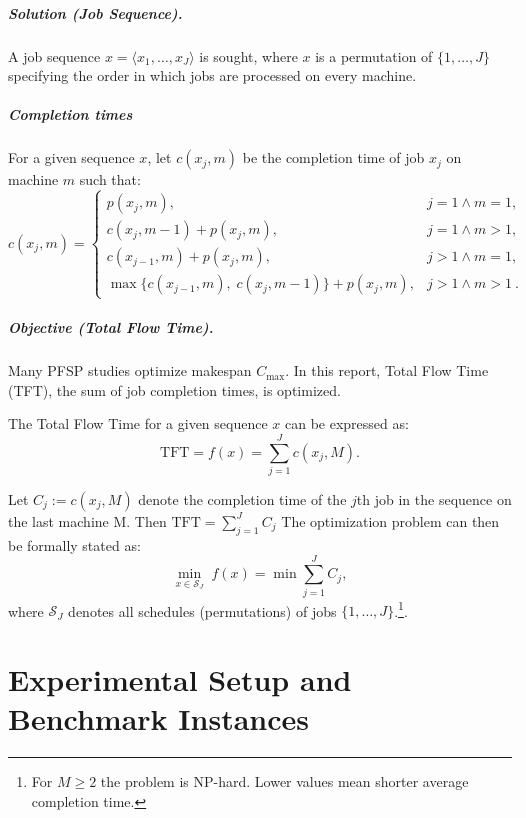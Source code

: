 \documentclass[12pt,a4paper]{report}
\begin{document}
\paragraph{Solution (Job Sequence).}
A job sequence $x = \langle x_1,\ldots,x_J\rangle$ is sought, where $x$ is a permutation of $\{1,\ldots,J\}$ specifying the order in which jobs are processed on every machine.

\paragraph{Completion times}
For a given sequence $x$, let $c(x_j,m)$ be the completion time of job $x_j$ on machine $m$ such that:
\begin{equation}
\label{eq:c-recurrence}
 c(x_j,m) =
 \begin{cases}
  p(x_j,m), & j=1 \land m=1,\\
  c(x_j,m-1) + p(x_j,m), & j=1 \land m>1,\\
  c(x_{j-1},m) + p(x_j,m), & j>1 \land m=1,\\
  \max\{c(x_{j-1},m),\; c(x_j,m-1)\} + p(x_j,m), & j>1 \land m>1~. 
 \end{cases}
\end{equation}

\paragraph{Objective (Total Flow Time).}
Many PFSP studies optimize makespan \(C_{\max}\). In this report, Total Flow Time (TFT), the sum of job completion times, is optimized.

The Total Flow Time for a given sequence $x$ can be expressed as:
\[
\mathrm{TFT} = f(x) = \sum_{j=1}^{J} c(x_j, M).
\]

Let $C_j := c(x_j,M)$ denote the completion time of the $j$th job in the sequence on the last machine M. Then $\mathrm{TFT} = \sum_{j=1}^{J} C_j$ The optimization problem can then be formally stated as:
\begin{equation}
 \min_{x \in \mathcal{S}_J} \; f(x) = \min \sum_{j=1}^{J} C_j,
\end{equation}
where $\mathcal{S}_J$ denotes all schedules (permutations) of jobs $\{1,\ldots,J\}$.\footnote{For $M\ge 2$ the problem is NP-hard. Lower values mean shorter average completion time.}. 


\chapter{Experimental Setup and Benchmark Instances}
\end{document}
